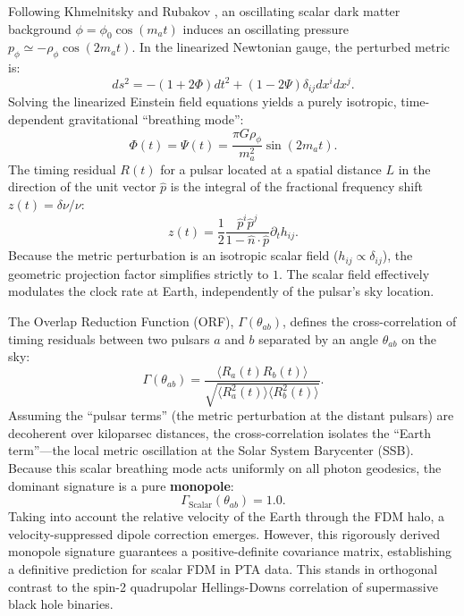 \documentclass[aps,prd,twocolumn,nofootinbib,superscriptaddress,10pt]{revtex4-2}
\begin{document}
Following Khmelnitsky and Rubakov \cite{Khmelnitsky2014}, an oscillating scalar dark matter background $\phi = \phi_0 \cos(m_a t)$ induces an oscillating pressure $p_\phi \simeq -\rho_\phi \cos(2m_a t)$. In the linearized Newtonian gauge, the perturbed metric is:
\begin{equation}
    ds^2 = -(1+2\Phi)dt^2 + (1-2\Psi)\delta_{ij}dx^i dx^j.
\end{equation}
Solving the linearized Einstein field equations yields a purely isotropic, time-dependent gravitational ``breathing mode'':
\begin{equation}
    \Phi(t) = \Psi(t) = \frac{\pi G \rho_\phi}{m_a^2} \sin(2m_a t).
\end{equation}
The timing residual $R(t)$ for a pulsar located at a spatial distance $L$ in the direction of the unit vector $\hat{p}$ is the integral of the fractional frequency shift $z(t) = \delta \nu / \nu$:
\begin{equation}
    z(t) = \frac{1}{2} \frac{\hat{p}^i \hat{p}^j}{1 - \hat{n} \cdot \hat{p}} \partial_t h_{ij}.
\end{equation}
Because the metric perturbation is an isotropic scalar field ($h_{ij} \propto \delta_{ij}$), the geometric projection factor simplifies strictly to $1$. The scalar field effectively modulates the clock rate at Earth, independently of the pulsar's sky location.

The Overlap Reduction Function (ORF), $\Gamma(\theta_{ab})$, defines the cross-correlation of timing residuals between two pulsars $a$ and $b$ separated by an angle $\theta_{ab}$ on the sky:
\begin{equation}
    \Gamma(\theta_{ab}) = \frac{\langle R_a(t) R_b(t) \rangle}{\sqrt{\langle R_a^2(t) \rangle \langle R_b^2(t) \rangle}}.
\end{equation}
Assuming the ``pulsar terms'' (the metric perturbation at the distant pulsars) are decoherent over kiloparsec distances, the cross-correlation isolates the ``Earth term''---the local metric oscillation at the Solar System Barycenter (SSB). Because this scalar breathing mode acts uniformly on all photon geodesics, the dominant signature is a pure \textbf{monopole}:
\begin{equation}
    \Gamma_{\text{Scalar}}(\theta_{ab}) = 1.0.
\end{equation}
Taking into account the relative velocity of the Earth through the FDM halo, a velocity-suppressed dipole correction emerges. However, this rigorously derived monopole signature guarantees a positive-definite covariance matrix, establishing a definitive prediction for scalar FDM in PTA data. This stands in orthogonal contrast to the spin-2 quadrupolar Hellings-Downs correlation of supermassive black hole binaries.
\end{document}
